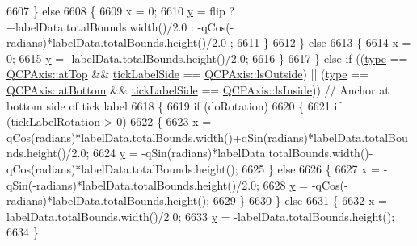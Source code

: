 \begin{DoxyCode}
6607       \} \textcolor{keywordflow}{else}
6608       \{
6609         x = 0;
6610         \hyperlink{_comparision_pictures_2_createtest_image_8m_a2fb1c5cf58867b5bbc9a1b145a86f3a0}{y} = flip ? +labelData.totalBounds.width()/2.0 : -qCos(-radians)*labelData.totalBounds.height()/2.0
      ;
6611       \}
6612     \} \textcolor{keywordflow}{else}
6613     \{
6614       x = 0;
6615       \hyperlink{_comparision_pictures_2_createtest_image_8m_a2fb1c5cf58867b5bbc9a1b145a86f3a0}{y} = -labelData.totalBounds.height()/2.0;
6616     \}
6617   \} \textcolor{keywordflow}{else} \textcolor{keywordflow}{if} ((\hyperlink{class_q_c_p_axis_painter_private_ae04594e97417336933d807c86d353098}{type} == \hyperlink{class_q_c_p_axis_ae2bcc1728b382f10f064612b368bc18aac0ece2b680d3f545e701f75af1655977}{QCPAxis::atTop} && \hyperlink{class_q_c_p_axis_painter_private_a9d27f7625fcfbeb3a60193d0c18fc7e9}{tickLabelSide} == 
      \hyperlink{class_q_c_p_axis_a24b13374b9b8f75f47eed2ea78c37db9a2eadb509fc0c9a8b35b85c86ec9f3c7a}{QCPAxis::lsOutside}) || (\hyperlink{class_q_c_p_axis_painter_private_ae04594e97417336933d807c86d353098}{type} == \hyperlink{class_q_c_p_axis_ae2bcc1728b382f10f064612b368bc18aa220d68888516b6c3b493d144f1ba438f}{QCPAxis::atBottom} && 
      \hyperlink{class_q_c_p_axis_painter_private_a9d27f7625fcfbeb3a60193d0c18fc7e9}{tickLabelSide} == \hyperlink{class_q_c_p_axis_a24b13374b9b8f75f47eed2ea78c37db9aae7b027ac2839cf4ad611df30236fc3f}{QCPAxis::lsInside})) \textcolor{comment}{// Anchor at bottom side of tick label}
6618   \{
6619     \textcolor{keywordflow}{if} (doRotation)
6620     \{
6621       \textcolor{keywordflow}{if} (\hyperlink{class_q_c_p_axis_painter_private_ae6ade9232a8e400924009e8edca94bac}{tickLabelRotation} > 0)
6622       \{
6623         x = -qCos(radians)*labelData.totalBounds.width()+qSin(radians)*labelData.totalBounds.height()/2.0;
6624         \hyperlink{_comparision_pictures_2_createtest_image_8m_a2fb1c5cf58867b5bbc9a1b145a86f3a0}{y} = -qSin(radians)*labelData.totalBounds.width()-qCos(radians)*labelData.totalBounds.height();
6625       \} \textcolor{keywordflow}{else}
6626       \{
6627         x = -qSin(-radians)*labelData.totalBounds.height()/2.0;
6628         \hyperlink{_comparision_pictures_2_createtest_image_8m_a2fb1c5cf58867b5bbc9a1b145a86f3a0}{y} = -qCos(-radians)*labelData.totalBounds.height();
6629       \}
6630     \} \textcolor{keywordflow}{else}
6631     \{
6632       x = -labelData.totalBounds.width()/2.0;
6633       \hyperlink{_comparision_pictures_2_createtest_image_8m_a2fb1c5cf58867b5bbc9a1b145a86f3a0}{y} = -labelData.totalBounds.height();
6634     \}

\end{DoxyCode}
